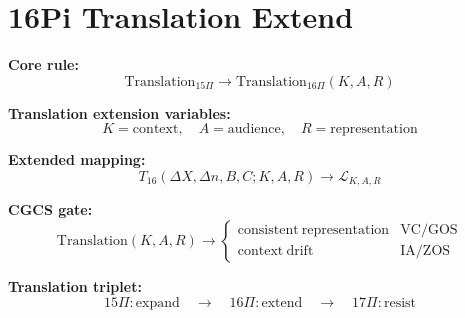 \section*{16Pi Translation Extend}

\textbf{Core rule:}
\[
\mathrm{Translation}_{15\Pi}
\rightarrow
\mathrm{Translation}_{16\Pi}(K,A,R)
\]

\textbf{Translation extension variables:}
\[
K = \mathrm{context}, \quad A = \mathrm{audience}, \quad R = \mathrm{representation}
\]

\textbf{Extended mapping:}
\[
T_{16}(\Delta X,\Delta n,B,C;K,A,R)
\rightarrow \mathcal{L}_{K,A,R}
\]

\textbf{CGCS gate:}
\[
\mathrm{Translation}(K,A,R) \rightarrow
\begin{cases}
\mathrm{consistent\ representation} & \text{VC/GOS} \\
\mathrm{context\ drift} & \text{IA/ZOS}
\end{cases}
\]

\textbf{Translation triplet:}
\[
15\Pi:\mathrm{expand}
\quad\rightarrow\quad
16\Pi:\mathrm{extend}
\quad\rightarrow\quad
17\Pi:\mathrm{resist}
\]

